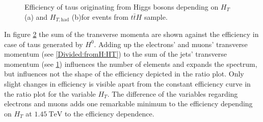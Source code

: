 \begin{figure}
\begin{subfigure}[t]{0.49\textwidth}
                \label{Divided:fromH:HThad}
                \end{subfigure}
\caption[Efficiency of taus originating from Higgs bosons for events from $t\bar{t}H$ sample.]{Efficiency of taus originating from Higgs bosons depending on $H_{T}$ (a) and $H_{T,\text{had}}$ (b)for events from $t\bar{t}H$ sample.}
\label{Divided:fromH:HTgedöns}
\end{figure}
%
In figure \ref{Divided:fromH:HTgedöns} the sum of the transverse momenta are shown against the efficiency in case of taus generated by $H^0$. Adding up the electrons' and muons' transverse momentum (see \ref{Divided:fromH:HT}) to the sum of the jets' transverse momentum (see \ref{Divided:fromH:HThad}) influences the number of elements and expands the spectrum, but influences not the shape of the efficiency depicted in the ratio plot. Only slight changes in efficiency is visible apart from the constant efficiency curve in the ratio plot for the variable $H_T$. The difference of the variables regarding electrons and muons adds one remarkable minimum to the efficiency depending on $H_T$ at $\SI{1.45}{\tera\electronvolt}$ to the efficiency dependence.\newline
%
%
